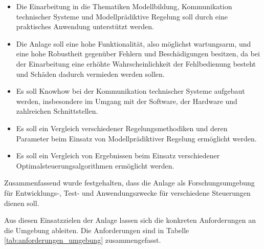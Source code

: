\begin{itemize}
	\item Die Einarbeitung in die Thematiken Modellbildung, Kommunikation technischer Systeme und Modellprädiktive Regelung soll durch eine praktisches Anwendung unterstützt werden.
	\item Die Anlage soll eine hohe Funktionalität, also möglichst wartungsarm, und eine hohe Robustheit gegenüber Fehlern und Beschädigungen besitzen, da bei der Einarbeitung eine erhöhte Wahrscheinlichkeit der Fehlbedienung besteht und Schäden dadurch vermieden werden sollen.
	\item Es soll Knowhow bei der Kommunikation technischer Systeme aufgebaut werden, insbesondere im Umgang mit der Software, der Hardware und zahlreichen Schnittstellen.
	\item Es soll ein Vergleich verschiedener Regelungsmethodiken und deren Parameter beim Einsatz von Modellprädiktiver Regelung ermöglicht werden.
	\item Es soll ein Vergleich von Ergebnissen beim Einsatz verschiedener Optimalsteuerungsalgorithmen ermöglicht werden.
\end{itemize}

Zusammenfassend wurde festgehalten, dass die Anlage als Forschungsumgebung für Entwicklungs-, Test- und Anwendungszwecke für verschiedene Steuerungen dienen soll.

Aus diesen Einsatzzielen der Anlage lassen sich die konkreten Anforderungen an die Umgebung ableiten. Die Anforderungen sind in Tabelle \ref{tab:anforderungen_umgebung} zusammengefasst.

